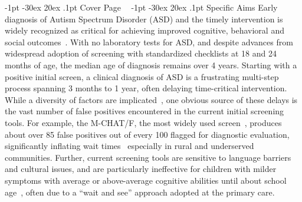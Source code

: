 \documentclass[onecolumn, compsoc,11pt]{IEEEtran}
\makeatletter
\renewcommand\section{\@startsection {section}{1}{\z@}%
                                   {-1pt \@plus -30ex \@minus 20ex}%
                                   {.1pt}%
                                   {\large\bfseries\scshape}}
\makeatother
\begin{document}
 
\section{Cover Page}
\clearpage
$\phantom{x}$
\vspace{-35pt}  
\section{Specific Aims}
Early diagnosis of Autism Spectrum Disorder (ASD) and the timely  intervention is widely recognized as critical for achieving improved cognitive, behavioral and social outcomes~\cite{hyman2020identification}. With no laboratory tests for ASD, and despite advances from widespread adoption of screening with standardized checklists at 18 and 24 months of age, the median age of diagnosis remains over 4 years.  Starting with a positive initial screen, a clinical diagnosis of ASD is  a  frustrating multi-step process spanning 3 months to 1 year, often delaying  time-critical intervention. While a diversity of factors are implicated~\cite{kalb2012determinants,bisgaier2011access,fenikile2015barriers,pmid27565363}, one obvious source of these delays  is the vast number of false positives encountered in the current initial  screening tools. For example, the  M-CHAT/F, the most widely used  screen~\cite{robins2014validation,hyman2020identification},  produces about   over 85 false positives out of every 100   flagged for  diagnostic evaluation, significantly inflating wait times~\cite{pmid27565363} especially in rural and underserved communities.
Further, current  screening tools are sensitive to language barriers and cultural issues, and are  particularly ineffective for children with milder symptoms  with average or above-average cognitive abilities until about school age~\cite{jashar2016cognitive,hyman2020identification}, often due to a ``wait and see'' approach adopted at the primary care.
\end{document}
